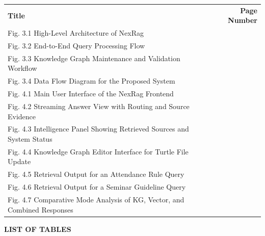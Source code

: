 \noindent
\begin{tabularx}{\textwidth}{>{\RaggedRight\arraybackslash}X r}
            \textbf{Title} & \textbf{Page Number} \\[0.6cm]
            
            Fig. 3.1 High-Level Architecture of NexRag & \pageref{fig:nexrag-architecture} \\[0.3cm]
            Fig. 3.2 End-to-End Query Processing Flow & \pageref{fig:nexrag-query-flow} \\[0.3cm]
            Fig. 3.3 Knowledge Graph Maintenance and Validation Workflow & \pageref{fig:nexrag-kg-workflow} \\[0.3cm]
            Fig. 3.4 Data Flow Diagram for the Proposed System & \pageref{fig:nexrag-dfd} \\[0.3cm]
            Fig. 4.1 Main User Interface of the NexRag Frontend & \pageref{fig:nexrag-main-ui} \\[0.3cm]
            Fig. 4.2 Streaming Answer View with Routing and Source Evidence & \pageref{fig:nexrag-streaming-answer} \\[0.3cm]
            Fig. 4.3 Intelligence Panel Showing Retrieved Sources and System Status & \pageref{fig:nexrag-sources-panel} \\[0.3cm]
            Fig. 4.4 Knowledge Graph Editor Interface for Turtle File Update & \pageref{fig:nexrag-kg-editor} \\[0.3cm]
            Fig. 4.5 Retrieval Output for an Attendance Rule Query & \pageref{fig:nexrag-query-attendance} \\[0.3cm]
            Fig. 4.6 Retrieval Output for a Seminar Guideline Query & \pageref{fig:nexrag-query-seminar} \\[0.3cm]
            Fig. 4.7 Comparative Mode Analysis of KG, Vector, and Combined Responses & \pageref{fig:nexrag-mode-comparison} \\[0.3cm]

\end{tabularx}

\newpage
\begin{center}
            {\fontsize{14}{16}\selectfont \textbf{LIST OF TABLES}}
\end{center}
\label{front:list-tables}
\vspace{1cm}
\renewcommand{\arraystretch}{1.5}

